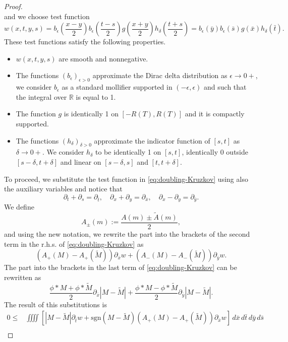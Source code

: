 \documentclass[11pt,a4paper,oneside]{amsart}
\newcommand\R{\mathbb{R}}
\newcommand{\sgn}{\text{sgn}}
\newcommand\eps{\epsilon}
\begin{document}
\begin{proof}
$$        $$
        and we choose test function
        $$
        w(x,t,y,s)=b_\eps\left( \frac{x-y}{2}\right)b_\eps\left( \frac{t-s}{2}\right)g\left( \frac{x+y}{2} \right)h_\delta\left( \frac{t+s}{2} \right)
        =b_\eps(\bar y)b_\eps( \bar s)g(\bar x)h_\delta(\bar t).
        $$
        These test functions satisfy the following properties.
        \begin{itemize}
        \item $w(x,t,y,s)$ are smooth and nonnegative.
            \item The functions $(b_\eps)_{\eps>0}$ approximate the Dirac delta distribution as $\eps\to0+$, 
            we consider $b_\eps$ as a standard mollifier supported in $(-\eps,\eps)$ and such that the integral over $\R$ is equal to 1.
            \item The function $g$ is identically 1 on $[-R(T),R(T)]$ and it is compactly supported.
            \item The functions $(h_\delta)_{\delta>0}$ approximate the indicator function of $[s,t]$ as $\delta\to0+$. 
            We consider $h_\delta$ to be identically 1 on $[s,t]$, identically 0 outside $[s-\delta,t+\delta]$ and linear on $[s-\delta,s]$ and $[t,t+\delta]$.
        \end{itemize}
        To proceed, we substitute the test function in \eqref{eq:doubling-Kruzkov} using also the auxiliary variables and notice that
        $$
        \partial_t+\partial_s=\partial_{\bar t},\quad \partial_x+\partial_y=\partial_{\bar x},\quad \partial_x-\partial_y=\partial_{\bar y}.
        $$
        We define
        $$
        A_\pm(m):=\frac{A(m)\pm \tilde A(m)}{2},
        $$
        and using the new notation, we rewrite the part into the brackets of the second term in the r.h.s. of \eqref{eq:doubling-Kruzkov} as
        $$
        (A_+(M)-A_+(\tilde M))\partial_{\bar x}w+(A_-(M)-A_-(\tilde M))\partial_{\bar y}w.
        $$
        The part into the brackets in the last term of \eqref{eq:doubling-Kruzkov} can be rewritten as
        $$
        \frac{\phi\ast M+\phi\ast\tilde M}{2}\partial_{\bar x}|M-\tilde M|+\frac{\phi\ast M-\phi\ast\tilde M}{2}\partial_{\bar y}|M-\tilde M|.
        $$
        The result of this substitutions is
        \begin{equation}
             \begin{aligned}
            0 \leq & \iiiint \left[ |M-\tilde M|\partial_{\bar t} w+\sgn(M-\tilde M)(A_+(M)-A_+(\tilde M))\partial_{\bar x}w\right]\,d\bar x\,d\bar t\,d\bar y\,d\bar s\\

\end{aligned}
\end{equation}
\end{proof}
\end{document}
